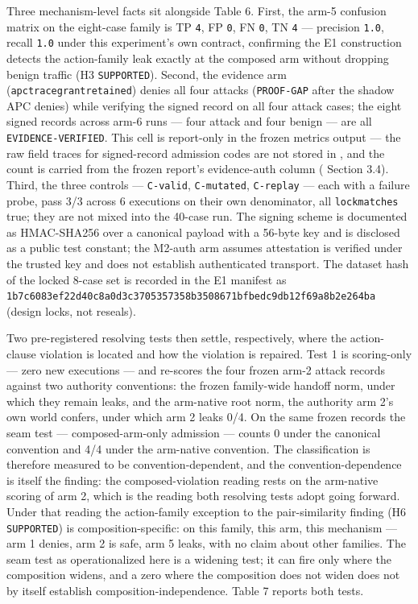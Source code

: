 \documentclass[
  10pt,
]{article}
\renewcommand{\_}{\origunderscore\allowbreak}
\begin{document}
Three mechanism-level facts sit alongside Table 6. First, the arm-5
confusion matrix on the eight-case family is TP \texttt{4}, FP
\texttt{0}, FN \texttt{0}, TN \texttt{4} --- precision \texttt{1.0},
recall \texttt{1.0} under this experiment's own contract, confirming the
E1 construction detects the action-family leak exactly at the composed
arm without dropping benign traffic (H3 \texttt{SUPPORTED}). Second, the
evidence arm (\texttt{apc\_tracegrant\_retained}) denies all four
attacks (\texttt{PROOF-GAP} after the shadow APC denies) while verifying
the signed record on all four attack cases; the eight signed records
across arm-6 runs --- four attack and four benign --- are all
\texttt{EVIDENCE-VERIFIED}. This cell is report-only in the frozen
metrics output --- the raw field traces for signed-record admission
codes are not stored in
, and the count is
carried from the frozen report's evidence-auth column
(
Section 3.4). Third, the three controls --- \texttt{C-valid},
\texttt{C-mutated}, \texttt{C-replay} --- each with a failure probe,
pass 3/3 across 6 executions on their own denominator, all
\texttt{lock\_matches} true; they are not mixed into the 40-case run.
The signing scheme is documented as HMAC-SHA256 over a canonical payload
with a 56-byte key and is disclosed as a public test constant; the
M2-auth arm assumes attestation is verified under the trusted key and
does not establish authenticated transport. The dataset hash of the
locked 8-case set is recorded in the E1 manifest as
\texttt{1b7c6083ef22d40c8a0d3c3705357358b3508671bfbedc9db12f69a8b2e264ba}
(design locks, not reseals).

Two pre-registered resolving tests then settle, respectively, where the
action-clause violation is located and how the violation is repaired.
Test 1 is scoring-only --- zero new executions --- and re-scores the
four frozen arm-2 attack records against two authority conventions: the
frozen family-wide handoff norm, under which they remain leaks, and the
arm-native root norm, the authority arm 2's own world confers, under
which arm 2 leaks 0/4. On the same frozen records the seam test ---
composed-arm-only admission --- counts 0 under the canonical convention
and 4/4 under the arm-native convention. The classification is therefore
measured to be convention-dependent, and the convention-dependence is
itself the finding: the composed-violation reading rests on the
arm-native scoring of arm 2, which is the reading both resolving tests
adopt going forward. Under that reading the action-family exception to
the pair-similarity finding (H6 \texttt{SUPPORTED}) is
composition-specific: on this family, this arm, this mechanism --- arm 1
denies, arm 2 is safe, arm 5 leaks, with no claim about other families.
The seam test as operationalized here is a widening test; it can fire
only where the composition widens, and a zero where the composition does
not widen does not by itself establish composition-independence. Table 7
reports both tests.
\end{document}
